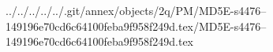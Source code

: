 ../../../../../.git/annex/objects/2q/PM/MD5E-s4476--149196e70cd6c64100feba9f958f249d.tex/MD5E-s4476--149196e70cd6c64100feba9f958f249d.tex